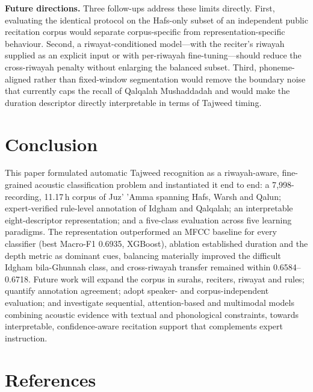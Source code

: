 \documentclass[runningheads]{llncs}
\begin{document}
\textbf{Future directions.} Three follow-ups address these limits directly.
First, evaluating the identical protocol on the Hafs-only subset of an
independent public recitation corpus would separate corpus-specific from
representation-specific behaviour. Second, a riwayat-conditioned model---with
the reciter's riwayah supplied as an explicit input or with per-riwayah
fine-tuning---should reduce the cross-riwayah penalty without enlarging the
balanced subset. Third, phoneme-aligned rather than fixed-window segmentation
would remove the boundary noise that currently caps the recall of Qalqalah
Mushaddadah and would make the duration descriptor directly interpretable in
terms of Tajweed timing.

\section{Conclusion}
\label{sec:conclusion}

This paper formulated automatic Tajweed recognition as a riwayah-aware,
fine-grained acoustic classification problem and instantiated it end to end: a
7{,}998-recording, 11.17\,h corpus of Juz' 'Amma spanning Hafs, Warsh and Qalun;
expert-verified rule-level annotation of Idgham and Qalqalah; an interpretable
eight-descriptor representation; and a five-class evaluation across five
learning paradigms. The representation outperformed an MFCC baseline for every
classifier (best Macro-F1 0.6935, XGBoost), ablation established duration and
the depth metric as dominant cues, balancing materially improved the difficult
Idgham bila-Ghunnah class, and cross-riwayah transfer remained within
0.6584--0.6718. Future work will expand the corpus in surahs, reciters, riwayat
and rules; quantify annotation agreement; adopt speaker- and corpus-independent
evaluation; and investigate sequential, attention-based and multimodal models
combining acoustic evidence with textual and phonological constraints, towards
interpretable, confidence-aware recitation support that complements expert
instruction.


\section*{References}
\label{sec:references}



\end{document}
